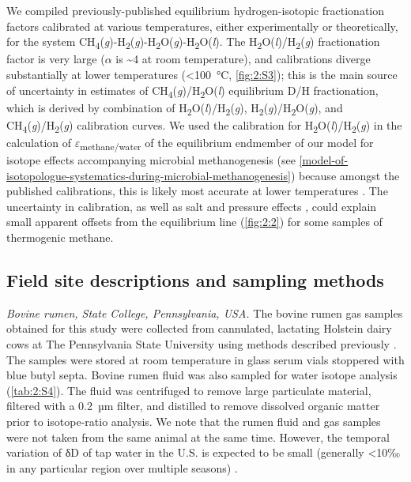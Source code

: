 We compiled previously-published equilibrium hydrogen-isotopic
fractionation factors calibrated at various temperatures, either
experimentally or theoretically, for the system
CH\textsubscript{4}(\emph{g})-H\textsubscript{2}(\emph{g})-H\textsubscript{2}O(\emph{g})-H\textsubscript{2}O(\emph{l}).
The H\textsubscript{2}O(\emph{l})/H\textsubscript{2}(\emph{g})
fractionation factor is very large ($\alpha$ is \textasciitilde{}4 at room
temperature), and calibrations diverge substantially at lower
temperatures (\textless{}100~°C, \autoref{fig:2:S3}); this is the main source of
uncertainty in estimates of
CH\textsubscript{4}(\emph{g})/H\textsubscript{2}O(\emph{l}) equilibrium
D/H fractionation, which is derived by combination of
H\textsubscript{2}O(\emph{l})/H\textsubscript{2}(\emph{g}),
H\textsubscript{2}(\emph{g})/H\textsubscript{2}O(\emph{g}), and
CH\textsubscript{4}(\emph{g})/H\textsubscript{2}(\emph{g}) calibration
curves. We used the \textcite{Cerrai++_1954} calibration for
H\textsubscript{2}O(\emph{l})\slash H\textsubscript{2}(\emph{g}) in the
calculation of $\varepsilon$\textsubscript{methane/water} of the equilibrium
endmember of our model for isotope effects accompanying microbial
methanogenesis (see \autoref{model-of-isotopologue-systematics-during-microbial-methanogenesis}) because amongst the published
calibrations, this is likely most accurate at lower temperatures \parencite{Horibe+Craig_1995_GCA,Roston+Kohen_2010_PNAS,Suess_1949}. The uncertainty in calibration, as
well as salt and pressure effects \parencite{Horita_2005_GcJ}, could explain small
apparent offsets from the equilibrium line (\autoref{fig:2:2}) for some samples of
thermogenic methane.

\subsection{Field site descriptions and sampling
	methods}\label{field-site-descriptions-and-sampling-methods}

\emph{Bovine rumen, State College, Pennsylvania, USA.} The bovine rumen
gas samples obtained for this study were collected from cannulated,
lactating Holstein dairy cows at The Pennsylvania State University using
methods described previously \parencite{Tekippe++_2011_JoDS}. The samples were stored at
room temperature in glass serum vials stoppered with blue butyl septa.
Bovine rumen fluid was also sampled for water isotope analysis (\autoref{tab:2:S4}). The fluid was centrifuged to remove large particulate material,
filtered with a 0.2~µm filter, and distilled to remove dissolved organic
matter prior to isotope-ratio analysis. We note that the rumen fluid and
gas samples were not taken from the same animal at the same time.
However, the temporal variation of δD of tap water in the U.S. is
expected to be small (generally \textless{}10‰ in any particular region
over multiple seasons) \parencite{Bowen++_2007_WRR}.

